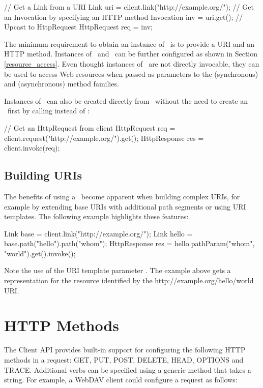 \begin{listing}{1}
// Get a Link from a URI
Link uri = client.link("http://example.org/");
// Get an Invocation by specifying an HTTP method
Invocation inv = uri.get();
// Upcast to HttpRequest
HttpRequest req = inv;
\end{listing}

The minimum requirement to obtain an instance of \Invocation\ is to provide a URI and an HTTP method. Instances of \Invocation\ and \HttpRequest\ can be further configured as shown in Section \ref{resource_access}. Even thought instances of \HttpRequest\ are not directly invocable, they can be used to access Web resources when passed as parameters to the  (synchronous) and  (asynchronous) method families.

Instances of \HttpRequest\ can also be created directly from \Client\ without the need to create an \Invocation\ first by calling  instead of :

\begin{listing}{1}
// Get an HttpRequest from client
HttpRequest req = client.request("http://example.org/").get();
HttpResponse res = client.invoke(req);
\end{listing}

\subsection{Building URIs}

The benefits of using a \Link\ become apparent when building complex URIs, for example by extending base URIs with additional path segments or using URI templates. The following example highlights these features:

\begin{listing}{1}
Link base = client.link("http://example.org/");
Link hello = base.path("hello").path("{whom}");   
HttpResponse res = hello.pathParam("whom", "world").get().invoke();
\end{listing}

Note the use of the URI template parameter . The example above gets a representation for the resource identified by the http://example.org/hello/world URI.

\section{HTTP Methods}

The Client API provides built-in support for configuring the following HTTP methods in a request: GET, PUT, POST, DELETE, HEAD, OPTIONS and TRACE. Additional verbs can be specified using a generic method that takes a string. For example, a WebDAV client could configure a request as follows:

